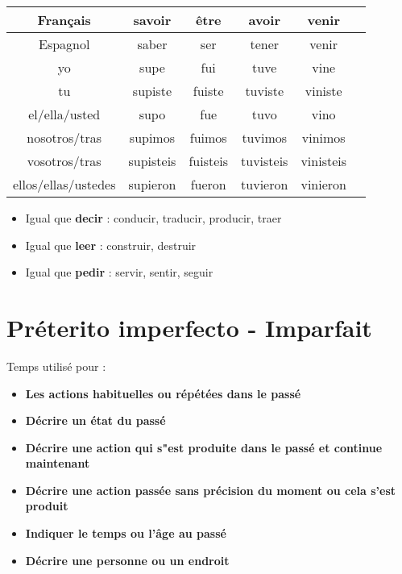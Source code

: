 \begin{table}[hbt!]
    \centering
    \setlength\tabcolsep{25pt}
    \begin{tabular}{|c||c|c|c|c|c|}
         \hline
         Français               & \textcolor{BrickRed}{savoir} & \textcolor{BrickRed}{être} & \textcolor{BrickRed}{avoir} & \textcolor{BrickRed}{venir} \\
         \hline
         Espagnol               & \textcolor{electricultramarine}{saber} & \textcolor{electricultramarine}{ser} & \textcolor{electricultramarine}{tener} & \textcolor{electricultramarine}{venir} \\
         \hline
         \hline
         yo                     & supe            & fui         & tuve        & vine     \\    
         \hline
         tu                     & supiste         & fuiste      & tuviste     & viniste  \\
         \hline
         el/ella/usted          & supo           & fue         & tuvo         & vino     \\
        \hline
        nosotros/tras           & supimos         & fuimos      & tuvimos      & vinimos  \\
        \hline
        vosotros/tras           & supisteis       & fuisteis    & tuvisteis    & vinisteis \\
        \hline
        ellos/ellas/ustedes     & supieron        & fueron      & tuvieron     & vinieron   \\
        \hline
    \end{tabular}
    \label{tab:label2}
\end{table}
\begin{itemize}
    \item Igual que \textbf{decir} : conducir, traducir, producir, traer
    \item Igual que \textbf{leer} : construir, destruir
    \item Igual que \textbf{pedir} : servir, sentir, seguir
\end{itemize}
\newpage
\section{Préterito imperfecto - Imparfait}
Temps utilisé pour : 
\begin{itemize}
    \item \textbf{Les actions habituelles ou répétées dans le passé}
    \item \textbf{Décrire un état du passé}
    \item \textbf{Décrire une action qui s"est produite dans le passé et continue maintenant}
    \item \textbf{Décrire une action passée sans précision du moment ou cela s'est produit}
    \item \textbf{Indiquer le temps ou l'âge au passé}
    \item \textbf{Décrire une personne ou un endroit}
\end{itemize}
